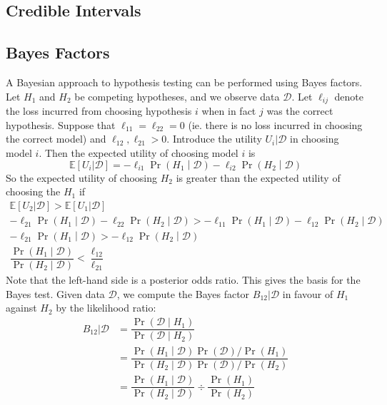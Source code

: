 \documentclass[11pt]{report} %
\begin{document}
\subsection{Credible Intervals}

\subsection{Bayes Factors \cite{Bernardo1994}}

A Bayesian approach to hypothesis testing can be performed using Bayes factors. Let $H_{1}$ and $H_{2}$ be competing hypotheses, and we observe data $\mathcal{D}$. Let $\ell_{ij}$ denote the loss incurred from choosing hypothesis $i$ when in fact $j$ was the correct hypothesis. Suppose that $\ell_{11} = \ell_{22} = 0$ (ie. there is no loss incurred in choosing the correct model) and $\ell_{12}, \ell_{21} > 0$. Introduce the utility $U_{i}|\mathcal{D}$ in choosing model $i$. Then the expected utility of choosing model $i$ is
\begin{equation}
\mathbb{E}\left[U_{i}|\mathcal{D}\right] = -\ell_{i1}\operatorname{Pr}\left(H_{1}\middle|\mathcal{D}\right) - \ell_{i2}\operatorname{Pr}\left(H_{2}\middle|\mathcal{D}\right)
\end{equation}
So the expected utility of choosing $H_{2}$ is greater than the expected utility of choosing the $H_{1}$ if
\begin{gather}
\mathbb{E}\left[U_{2}|\mathcal{D}\right] > \mathbb{E}\left[U_{1}|\mathcal{D}\right] \\
-\ell_{21}\operatorname{Pr}\left(H_{1}\middle|\mathcal{D}\right) - \ell_{22}\operatorname{Pr}\left(H_{2}\middle|\mathcal{D}\right) > -\ell_{11}\operatorname{Pr}\left(H_{1}\middle|\mathcal{D}\right) - \ell_{12}\operatorname{Pr}\left(H_{2}\middle|\mathcal{D}\right) \\
-\ell_{21}\operatorname{Pr}\left(H_{1}\middle|\mathcal{D}\right)  >  - \ell_{12}\operatorname{Pr}\left(H_{2}\middle|\mathcal{D}\right) \\
\dfrac{\operatorname{Pr}\left(H_{1}\middle|\mathcal{D}\right)}{\operatorname{Pr}\left(H_{2}\middle|\mathcal{D}\right)} < \dfrac{\ell_{12}}{\ell_{21}}
\end{gather}
Note that the left-hand side is a posterior odds ratio. This gives the basis for the Bayes test. Given data $\mathcal{D}$, we compute the Bayes factor $B_{12}|\mathcal{D}$ in favour of $H_{1}$ against $H_{2}$ by the likelihood ratio:
\begin{align}
B_{12}|\mathcal{D} &= \dfrac{\operatorname{Pr}\left(\mathcal{D}\middle|H_{1}\right)}{\operatorname{Pr}\left(\mathcal{D}\middle|H_{2}\right)} \\
&= \dfrac{\operatorname{Pr}\left(H_{1}\middle|\mathcal{D}\right)\operatorname{Pr}\left(\mathcal{D}\right)/\operatorname{Pr}\left(H_{1}\right)}{\operatorname{Pr}\left(H_{2}\middle|\mathcal{D}\right)\operatorname{Pr}\left(\mathcal{D}\right)/\operatorname{Pr}\left(H_{2}\right)} \\
&= \dfrac{\operatorname{Pr}\left(H_{1}\middle|\mathcal{D}\right)}{\operatorname{Pr}\left(H_{2}\middle|\mathcal{D}\right)} \div \dfrac{\operatorname{Pr}\left(H_{1}\right)}{\operatorname{Pr}\left(H_{2}\right)}
\end{align}
\end{document}
